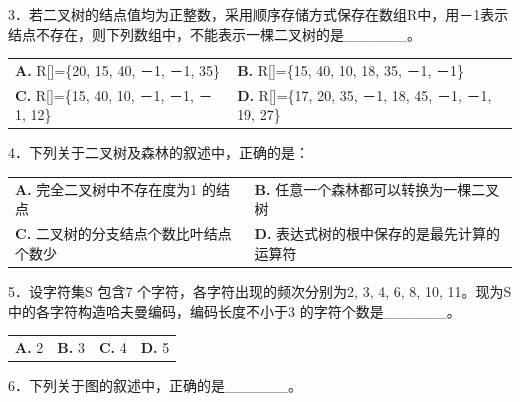 \documentclass[UTF8,11pt]{ctexart}
\begin{document}
3．若二叉树的结点值均为正整数，采用顺序存储方式保存在数组R中，用－1表示结点不存在，则下列数组中，不能表示一棵二叉树的是\_\_\_\_\_\_。


\begin{center}\begin{tabular}{>{\raggedright\arraybackslash}p{\dimexpr(\linewidth-4\tabcolsep)/2\relax}>{\raggedright\arraybackslash}p{\dimexpr(\linewidth-4\tabcolsep)/2\relax}}
\textbf{A.} R[]=\{20, 15, 40, －1, －1, 35\} & \textbf{B.} R[]=\{15, 40, 10, 18, 35, －1, －1\}\\[.35em]
\textbf{C.} R[]=\{15, 40, 10, －1, －1, －1, 12\} & \textbf{D.} R[]=\{17, 20, 35, －1, 18, 45, －1, －1, 19, 27\}\\[.35em]\end{tabular}\end{center}

4．下列关于二叉树及森林的叙述中，正确的是：


\begin{center}\begin{tabular}{>{\raggedright\arraybackslash}p{\dimexpr(\linewidth-4\tabcolsep)/2\relax}>{\raggedright\arraybackslash}p{\dimexpr(\linewidth-4\tabcolsep)/2\relax}}
\textbf{A.} 完全二叉树中不存在度为1 的结点 & \textbf{B.} 任意一个森林都可以转换为一棵二叉树\\[.35em]
\textbf{C.} 二叉树的分支结点个数比叶结点个数少 & \textbf{D.} 表达式树的根中保存的是最先计算的运算符\\[.35em]\end{tabular}\end{center}

5．设字符集S 包含7 个字符，各字符出现的频次分别为2, 3, 4, 6, 8, 10, 11。现为S 中的各字符构造哈夫曼编码，编码长度不小于3 的字符个数是\_\_\_\_\_\_。


\begin{center}\begin{tabular}{>{\raggedright\arraybackslash}p{\dimexpr(\linewidth-8\tabcolsep)/4\relax}>{\raggedright\arraybackslash}p{\dimexpr(\linewidth-8\tabcolsep)/4\relax}>{\raggedright\arraybackslash}p{\dimexpr(\linewidth-8\tabcolsep)/4\relax}>{\raggedright\arraybackslash}p{\dimexpr(\linewidth-8\tabcolsep)/4\relax}}
\textbf{A.} 2 & \textbf{B.} 3 & \textbf{C.} 4 & \textbf{D.} 5\\[.35em]\end{tabular}\end{center}

6．下列关于图的叙述中，正确的是\_\_\_\_\_\_。
\end{document}
